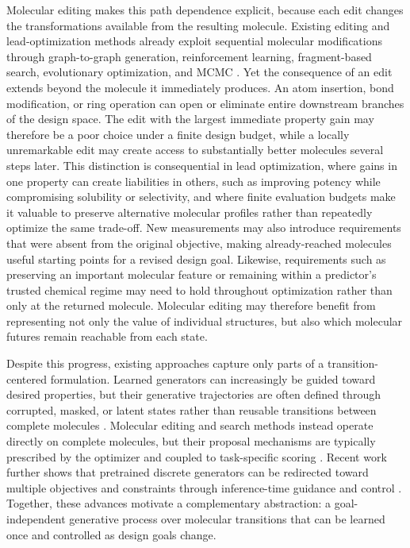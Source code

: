 Molecular editing makes this path dependence explicit, because each edit changes the transformations available from the resulting molecule. Existing editing and lead-optimization methods already exploit sequential molecular modifications through graph-to-graph generation, reinforcement learning, fragment-based search, evolutionary optimization, and MCMC \citep{jin2019vjtnn,zhou2019moldqn,jensen2019graphga,xie2021mars,fu2021mimosa}. Yet the consequence of an edit extends beyond the molecule it immediately produces. An atom insertion, bond modification, or ring operation can open or eliminate entire downstream branches of the design space. The edit with the largest immediate property gain may therefore be a poor choice under a finite design budget, while a locally unremarkable edit may create access to substantially better molecules several steps later. This distinction is consequential in lead optimization, where gains in one property can create liabilities in others, such as improving potency while compromising solubility or selectivity, and where finite evaluation budgets make it valuable to preserve alternative molecular profiles rather than repeatedly optimize the same trade-off. New measurements may also introduce requirements that were absent from the original objective, making already-reached molecules useful starting points for a revised design goal. Likewise, requirements such as preserving an important molecular feature or remaining within a predictor's trusted chemical regime may need to hold throughout optimization rather than only at the returned molecule. Molecular editing may therefore benefit from representing not only the value of individual structures, but also which molecular futures remain reachable from each state.

Despite this progress, existing approaches capture only parts of a transition-centered formulation. Learned generators can increasingly be guided toward desired properties, but their generative trajectories are often defined through corrupted, masked, or latent states rather than reusable transitions between complete molecules \citep{vignac2023digress,campbell2024multiflow,lee2025genmol}. Molecular editing and search methods instead operate directly on complete molecules, but their proposal mechanisms are typically prescribed by the optimizer and coupled to task-specific scoring \citep{jensen2019graphga,zhou2019moldqn,xie2021mars}. Recent work further shows that pretrained discrete generators can be redirected toward multiple objectives and constraints through inference-time guidance and control \citep{chen2025areuredi,pcomole2026}. Together, these advances motivate a complementary abstraction: a goal-independent generative process over molecular transitions that can be learned once and controlled as design goals change.

